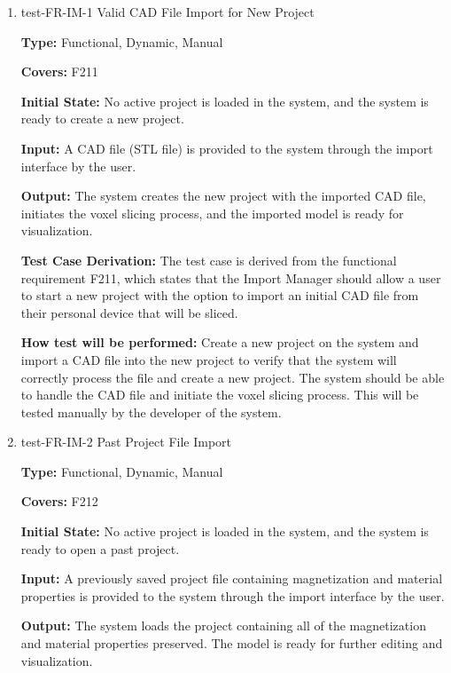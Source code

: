 \documentclass[12pt, titlepage]{article}
\begin{document}
\begin{enumerate}

\item{test-FR-IM-1 Valid CAD File Import for New Project\\}
\label{sec:t-im-1}

\textbf{Type:} Functional, Dynamic, Manual

\textbf{Covers:} F211
					
\textbf{Initial State:} No active project is loaded in the system, and the system is ready to create a new project.
					
\textbf{Input:} A CAD file (STL file) is provided to the system through the import interface by the user.
					
\textbf{Output:} The system creates the new project with the imported CAD file, initiates the voxel slicing process, and the imported model is ready for visualization.

\textbf{Test Case Derivation:} The test case is derived from the functional requirement F211, which states that the Import Manager should allow a user to start a new project with the option to import an initial CAD file from their personal device that will be sliced.
					
\textbf{How test will be performed:} Create a new project on the system and import a CAD file into the new project to verify that the system will correctly process the file and create a new project. The system should be able to handle the CAD file and initiate the voxel slicing process. This will be tested manually by the developer of the system.

\item{test-FR-IM-2 Past Project File Import\\}
\label{sec:t-im-2}

\textbf{Type:} Functional, Dynamic, Manual

\textbf{Covers:} F212
					
\textbf{Initial State:} No active project is loaded in the system, and the system is ready to open a past project.
					
\textbf{Input:} A previously saved project file containing magnetization and material properties is provided to the system through the import interface by the user.
					
\textbf{Output:} The system loads the project containing all of the magnetization and material properties preserved. The model is ready for further editing and visualization.


\end{enumerate}
\end{document}
